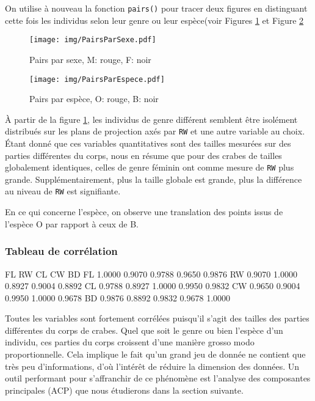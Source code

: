 \documentclass{article}
\begin{document}
\begin{multicols}{2}
	On utilise à nouveau la fonction \verb|pairs()| pour tracer deux figures en distinguant cette fois les individus selon leur genre ou leur espèce(voir Figures \ref{fig:pairs par sexe} et Figure \ref{fig:pairs par espece}
	\begin{figure}[H]
		\centering
		\texttt{[image: img/PairsParSexe.pdf]}
		\caption{Pairs par sexe, M: rouge, F: noir}
		\label{fig:pairs par sexe}
	\end{figure}
	\begin{figure}[H]
		\centering
		\texttt{[image: img/PairsParEspece.pdf]}
		\caption{Pairs par espèce, O: rouge, B: noir}
		\label{fig:pairs par espece}
	\end{figure}

    À partir de la figure \ref{fig:pairs par sexe}, les individus de genre différent semblent être isolément distribués sur les plans de projection axés par \verb|RW| et une autre variable au choix. 
    Étant donné que ces variables quantitatives sont des tailles mesurées sur des parties différentes du corps, nous en résume que pour des crabes de tailles globalement identiques, celles de genre féminin ont comme mesure de \verb|RW| plus grande. Supplémentairement, plus la taille globale est grande, plus la différence au niveau de \verb|RW| est signifiante. 
    
    En ce qui concerne l'espèce, on observe une translation des points issus de l'espèce O par rapport à ceux de B\@.    
    
    \subsubsection{Tableau de corrélation} 
    \label{tab: tableau de correlation}
    \begin{mdframed}
\begin{footnotesize}
\begin{Schunk}
\begin{Soutput}
     FL     RW     CL     CW     BD
FL 1.0000 0.9070 0.9788 0.9650 0.9876
RW 0.9070 1.0000 0.8927 0.9004 0.8892
CL 0.9788 0.8927 1.0000 0.9950 0.9832
CW 0.9650 0.9004 0.9950 1.0000 0.9678
BD 0.9876 0.8892 0.9832 0.9678 1.0000
\end{Soutput}
\end{Schunk}
\end{footnotesize}
    \end{mdframed}
    
	Toutes les variables sont fortement corrélées puisqu'il s'agit des tailles des parties différentes du corps de crabes. Quel que soit le genre ou bien l'espèce d'un individu, ces parties du corps croissent d'une manière grosso modo proportionnelle.
	Cela implique le fait qu’un grand jeu de donnée ne contient que très peu d'informations, d'où l'intérêt de réduire la dimension des données. Un outil performant pour s'affranchir de ce phénomène est l'analyse des composantes principales (ACP) que nous étudierons dans la section suivante.


\end{multicols}
\end{document}
